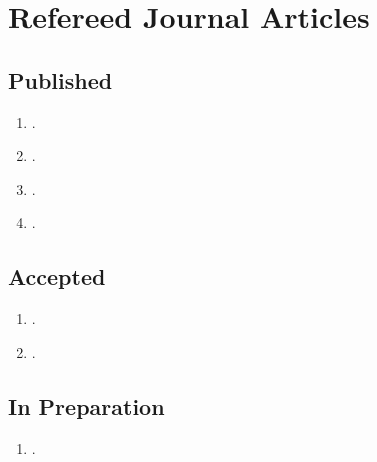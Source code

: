 \section*{Refereed Journal Articles}

\subsection*{Published}

\begin{enumerate}
	\item {}.
	\item {}.
	\item {}.
	\item {}.
\end{enumerate}

\subsection*{Accepted}

\begin{enumerate}
	\item {}.
	\item {}.
\end{enumerate}



\subsection*{In Preparation}

\begin{enumerate}
	\item {}.
\end{enumerate}

